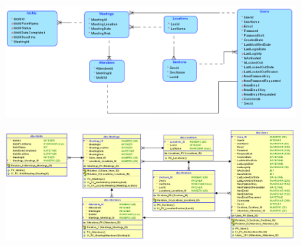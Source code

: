 

\begin{figure}[H]
    \centering
    \includegraphics[width=150mm]{img/logical.png}
\end{figure}

\begin{figure}[H]
    \centering
    \includegraphics[width=150mm]{img/relational.png}
\end{figure}


